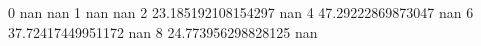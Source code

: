 0 nan nan
1 nan nan
2 23.185192108154297 nan
4 47.29222869873047 nan
6 37.72417449951172 nan
8 24.773956298828125 nan
